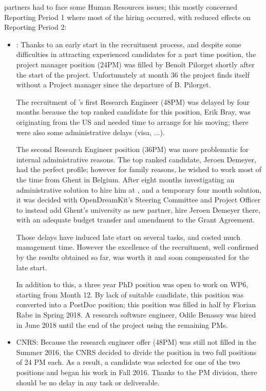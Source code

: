 \ODK partners had to face some Human Resources issues; this mostly
concerned Reporting Period 1 where most of the hiring occurred, with
reduced effects on Reporting Period 2:
\begin{itemize}
\item{:}
  Thanks to an early start in the recruitment process, and despite
  some difficulties in attracting experienced candidates for a part
  time position, the project manager position (24PM) was filled by
  Benoît Pilorget shortly after the start of the project. Unfortunately at month 36 the project
finds itself without a Project manager since the departure of B. Pilorget.

  The recruitment of 's first Research Engineer (48PM) was
  delayed by four months because the top ranked candidate for this
  position, Erik Bray, was originating from the US and needed time to
  arrange for his moving; there were also some administrative delays
  (visa, ...).

  The second Research Engineer position (36PM) was more problematic
  for internal administrative reasons. The top ranked candidate,
  Jeroen Demeyer, had the perfect profile; however for family reasons,
  he wished to work most of the time from Ghent in Belgium. After eight
  months investigating an administrative solution to hire him at
  , and a temporary four month solution, it was decided with
  OpenDreamKit's Steering Committee and Project Officer to instead add
  Ghent's university as new partner, hire Jeroen Demeyer there, with an
  adequate budget transfer and amendment to the Grant Agreement.

  Those delays have induced late start on several tasks, and costed
  much management time. However the excellence of the recruitment,
  well confirmed by the results obtained so far, was worth it and soon
  compensated for the late start.

  In addition to this, a three year PhD position was open to work on
  WP6, starting from Month 12. By lack of suitable candidate, this
  position was converted into a PostDoc position; this position was
  filled in half by Florian Rabe in Spring 2018. A research software
  engineer, Odile Benassy was hired in June 2018 until the end of the
  project using the remaining PMs.\\

\item{CNRS:} Because the research engineer offer (48PM) was still not
  filled in the Summer 2016, the CNRS decided to divide the position
  in two full positions of 24 PM each. As a result, a candidate was
  selected for one of the two positions and began his work in Fall
  2016. Thanks to the PM division, there should be no delay in any
  task or
  deliverable. \\


\end{itemize}

